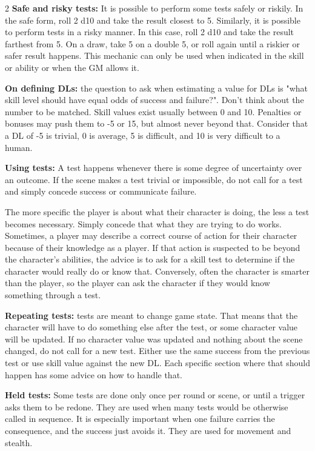\begin{multicols}{2}
\textbf{Safe and risky tests:} It is possible to perform some tests safely or riskily. In the safe form, roll 2 d10 and take the result closest to 5. Similarly, it is possible to perform tests in a risky manner. In this case, roll 2 d10 and take the result farthest from 5. On a draw, take 5 on a double 5, or roll again until a riskier or safer result happens. This mechanic can only be used when indicated in the skill or ability or when the GM allows it.


\textbf{On defining DLs:} the question to ask when estimating a value for DLs is "what skill level should have equal odds of success and failure?". Don't think about the number to be matched. Skill values exist usually between 0 and 10. Penalties or bonuses may push them to -5 or 15, but almost never beyond that. Consider that a DL of -5 is trivial, 0 is average, 5 is difficult, and 10 is very difficult to a human.

\textbf{Using tests:} A test happens whenever there is some degree of uncertainty over an outcome. If the scene makes a test trivial or impossible, do not call for a test and simply concede success or communicate failure. 

The more specific the player is about what their character is doing, the less a test becomes necessary. Simply concede that what they are trying to do works. Sometimes, a player may describe a correct course of action for their character because of their knowledge as a player. If that action is suspected to be beyond the character's abilities, the advice is to ask for a skill test to determine if the character would really do or know that. Conversely, often the character is smarter than the player, so the player can ask the character if they would know something through a test.

\textbf{Repeating tests:} tests are meant to change game state. That means that the character will have to do something else after the test, or some character value will be updated. If no character value was updated and nothing about the scene changed, do not call for a new test. Either use the same success from the previous test or use skill value against the new DL. Each specific section where that should happen has some advice on how to handle that.

\textbf{Held tests:} Some tests are done only once per round or scene, or until a trigger asks them to be redone. They are used when many tests would be otherwise called in sequence. It is especially important when one failure carries the consequence, and the success just avoids it. They are used for movement and stealth.  


\end{multicols}

